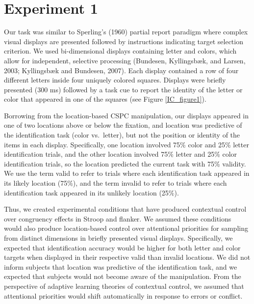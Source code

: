 \documentclass[]{DissertateCUNY}
\begin{document}
\hypertarget{experiment-1}{%
\section{Experiment 1}\label{experiment-1}}

Our task was similar to Sperling's (1960) partial report paradigm where
complex visual displays are presented followed by instructions
indicating target selection criterion. We used bi-dimensional displays
containing letter and colors, which allow for independent, selective
processing (Bundesen, Kyllingsbæk, and Larsen, 2003; Kyllingsbæk and
Bundesen, 2007). Each display contained a row of four different letters
inside four uniquely colored squares. Displays were briefly presented
(300 ms) followed by a task cue to report the identity of the letter or
color that appeared in one of the squares (see Figure \ref{IC_figure1}).

Borrowing from the location-based CSPC manipulation, our displays
appeared in one of two locations above or below the fixation, and
location was predictive of the identification task (color vs.~letter),
but not the position or identity of the items in each display.
Specifically, one location involved 75\% color and 25\% letter
identification trials, and the other location involved 75\% letter and
25\% color identification trials, so the location predicted the current
task with 75\% validity. We use the term valid to refer to trials where
each identification task appeared in its likely location (75\%), and the
term invalid to refer to trials where each identification task appeared
in its unlikely location (25\%).

Thus, we created experimental conditions that have produced contextual
control over congruency effects in Stroop and flanker. We assumed these
conditions would also produce location-based control over attentional
priorities for sampling from distinct dimensions in briefly presented
visual displays. Specifically, we expected that identification accuracy
would be higher for both letter and color targets when displayed in
their respective valid than invalid locations. We did not inform
subjects that location was predictive of the identification task, and we
expected that subjects would not become aware of the manipulation. From
the perspective of adaptive learning theories of contextual control, we
assumed that attentional priorities would shift automatically in
response to errors or conflict.
\end{document}
